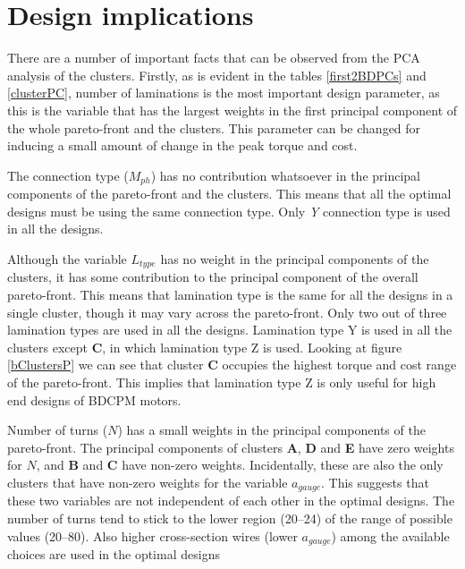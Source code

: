 \section{Design implications}
There are a number of important facts that can be observed from the PCA
analysis of the clusters. Firstly, as is evident in the tables
\ref{first2BDPCs} and \ref{clusterPC}, number of laminations is the most
important design parameter, as this is the variable that has the largest
weights in the first principal component of the whole pareto-front and the
clusters. This parameter can be changed for inducing a small amount of
change in the peak torque and cost.

The connection type ($M_{ph}$) has no contribution whatsoever in the
principal components of the pareto-front and the clusters. This means that
all the optimal designs must be using the same connection type. Only
\emph{Y} connection type is used in all the designs.
 
Although the variable $L_{type}$ has no weight in the principal
components of the clusters, it has some contribution to the principal
component of the overall pareto-front. This means that lamination type is
the same for all the designs in a single cluster, though it may vary across
the pareto-front. Only two out of three lamination types are used in all
the designs. Lamination type Y is used in all the clusters except
\textbf{C}, in which lamination type Z is used.  Looking at figure
\ref{bClustersP} we can see that cluster \textbf{C} occupies the highest
torque and cost range of the pareto-front. This implies that lamination
type Z is only useful for high end designs of BDCPM motors.

Number of turns ($N$) has a small weights in the principal components of
the pareto-front. The principal components of clusters \textbf{A},
\textbf{D} and \textbf{E} have zero weights for $N$, and \textbf{B} and
\textbf{C} have non-zero weights. Incidentally, these are also the only
clusters that have non-zero weights for the variable $a_{gauge}$. This
suggests that these two variables are not independent of each other in the
optimal designs. The number of turns tend to stick to the lower region
(20--24) of the range of possible values (20--80). Also higher
cross-section wires (lower $a_{gauge}$) among the available choices are
used in the optimal designs

